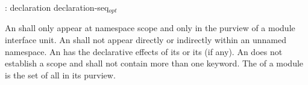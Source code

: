 \begin{std.txt}\color{addclr}
  \begin{bnf}\color{addclr}
    :\br
       declaration\br 
       \terminal{\{} declaration-seq${}_{opt}$ \terminal{\}} 
  \end{bnf}

  \resetalinea[0]
  \alinea 
  An  shall only appear
  at namespace scope and only in the purview of a module interface unit. 
  An  shall not appear directly
  or indirectly within an unnamed namespace. 
  An 
  has the declarative effects of its 
  or its  (if any).
  An  does not
  establish a scope and shall not contain more than one
   keyword.
  The  of a module  is the set of all
   in its purview.


\end{std.txt}
